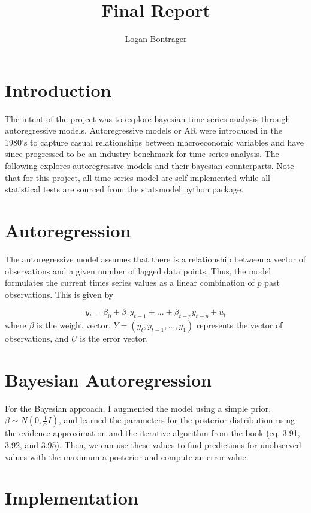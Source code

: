\documentclass{article}
\begin{document}
\title{Final Report}
\author{Logan Bontrager}
\maketitle


\section*{Introduction}

The intent of the project was to explore bayesian time series analysis through autoregressive models. Autoregressive models or AR were introduced in the 1980's to capture casual relationships between macroeconomic variables and have since progressed to be an industry benchmark for time series analysis. The following explores autoregressive models and their bayesian counterparts. Note that for this project, all time series model are self-implemented while all statistical tests are sourced from the statsmodel python package.

\section*{Autoregression}

The autoregressive model assumes that there is a relationship between a vector of observations and a given number of lagged data points. Thus, the model formulates the current times series values as a linear combination of $p$ past observations. This is given by

\[y_t = \beta_0 + \beta_1 y_{t-1} + ... + \beta_{t-p} y_{t-p} + u_t\]
where $\beta$ is the weight vector, $Y = (y_t, y_{t-1}, ..., y_1)$ represents the vector of observations, and $U$ is the error vector.

\section*{Bayesian Autoregression}

For the Bayesian approach, I augmented the model using a simple prior, $\beta \sim N(0, \frac{1}{\alpha}I)$, and learned the parameters for the posterior distribution using the evidence approximation and the iterative algorithm from the book (eq. 3.91, 3.92, and 3.95). Then, we can use these values to find predictions for unobserved values with the maximum a posterior and compute an error value.

\section*{Implementation}
\end{document}
